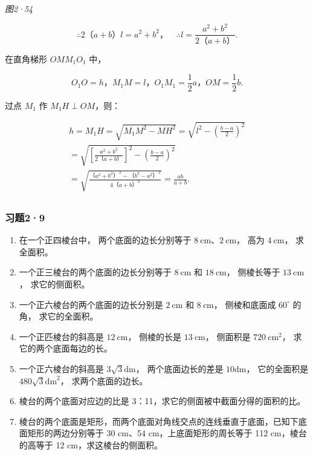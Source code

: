 \emph{图2·54}

\[
\therefore 2 \text{（}a + b\text{）} l = a ^ {2} + b ^ {2}\text{，} \quad \therefore l = \frac {a ^ {2} + b ^ {2}}{2 \text{（}a + b\text{）}}.
\]

在直角梯形 \(OMM_{1}O_{1}\) 中，

\[
O _ {1} O = h\text{，} M _ {1} M = l\text{，} O _ {1} M _ {1} = \frac {1}{2} a\text{，} O M = \frac {1}{2} b.
\]

过点 \(M_{1}\) 作 \(M_{1}H \perp OM\)，则：

\[
\begin{array}{l} h = M _ {1} H = \sqrt {M _ {1} M ^ {2} - M H ^ {2}} = \sqrt {l ^ {2} - \left(\frac {b - a}{2}\right) ^ {2}} \\ = \sqrt {\left[ \frac {a ^ {2} + b ^ {2}}{2 \text{（}a + b\text{）}} \right] ^ {2} - \left(\frac {b - a}{2}\right) ^ {2}} \\ = \sqrt {\frac {\text{（}a ^ {2} + b ^ {2}\text{）} ^ {2} - \text{（}b ^ {2} - a ^ {2}\text{）} ^ {2}}{4 \text{（}a + b\text{）} ^ {2}}} = \frac {a b}{a + b}. \\ \end{array}
\]

\subsubsection{习题2·9}

\begin{enumerate}
\item
  在一个正四棱台中， 两个底面的边长分别等于
  \(8 \mathrm{~cm}\text{、} 2 \mathrm{~cm}\)， 高为 \(4 \mathrm{~cm}\)，
  求全面积。
\item
  一个正三棱台的两个底面的边长分别等于 \(8 \mathrm{~cm}\) 和
  \(18 \mathrm{~cm}\)， 侧棱长等于 \(13 \mathrm{~cm}\)， 求它的侧面积。
\item
  一个正六棱台的两个底面的边长分别是 \(2 \mathrm{~cm}\) 和
  \(8 \mathrm{~cm}\)， 侧棱和底面成 \(60^{\circ}\) 的角， 求它的全面积。
\item
  一个正匹棱台的斜高是 \(12 \mathrm{~cm}\)， 侧棱的长是
  \(13 \mathrm{~cm}\)， 侧面积是 \(720 \mathrm{~cm}^{2}\)，
  求它的两个底面每边的长。
\item
  一个正六棱台的斜高是 \(3\sqrt{3}\mathrm{dm}\)， 两个底面边长的差是
  \(10\mathrm{dm}\)， 它的全面积是 \(480\sqrt{3}\mathrm{dm}^2\)，
  求两个底面的边长。
\item
  棱台的两个底面对应边的比是 3：11，求它的侧面被中截面分得的面积的比。
\item
  棱台的两个底面是矩形，而两个底面对角线交点的连线垂直于底面，已知下底面矩形的两边分别等于
  30 cm、54 cm，上底面矩形的周长等于 112 cm，棱台的高等于 12
  cm，求这棱台的侧面积。
\end{enumerate}

